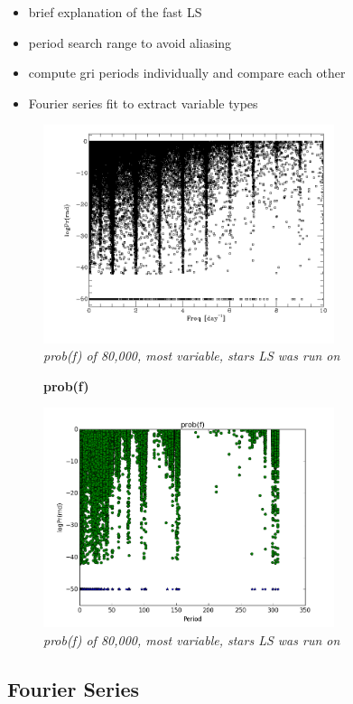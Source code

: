 \documentclass[aps,prl,twocolumn,superscriptaddress]{revtex4-1}
\begin{document}
\begin{itemize}
	\item{} brief explanation of the fast LS
	\item{} period search range to avoid aliasing
	\item{} compute gri periods individually and compare each other 
	\item{} Fourier series fit to extract variable types
\end{itemize}



\begin{figure}[H]
 \centering
 	\includegraphics[width=3.35in]{figures/fromJT/probf.png}
 \caption{\it \small{prob(f) of 80,000, most variable, stars LS was run on}}
 \label{fig:quartiles}
\end{figure}

\begin{figure}[H]
 \centering
 \textbf{prob(f)}\par\medskip
 	\includegraphics[width=3.35in]{figures/log_period_diff-50.png}
 \caption{\it \small{prob(f) of 80,000, most variable, stars LS was run on}}
 \label{fig:quartpy}
\end{figure}


\subsection{Fourier Series}
\end{document}
